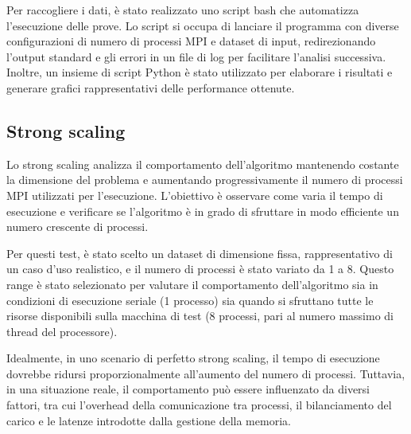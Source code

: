 \documentclass[letterpaper,11pt,leqno]{article}
\begin{document}
Per raccogliere i dati, è stato realizzato uno script bash che automatizza l'esecuzione delle prove. Lo script si occupa di lanciare il programma con diverse configurazioni di numero di processi MPI e dataset di input, redirezionando l'output standard e gli errori in un file di log per facilitare l'analisi successiva. Inoltre, un insieme di script Python è stato utilizzato per elaborare i risultati e generare grafici rappresentativi delle performance ottenute.  

\subsection{Strong scaling}

Lo strong scaling analizza il comportamento dell'algoritmo mantenendo costante la dimensione del problema e aumentando progressivamente il numero di processi MPI utilizzati per l'esecuzione. L'obiettivo è osservare come varia il tempo di esecuzione e verificare se l'algoritmo è in grado di sfruttare in modo efficiente un numero crescente di processi.  

Per questi test, è stato scelto un dataset di dimensione fissa, rappresentativo di un caso d'uso realistico, e il numero di processi è stato variato da 1 a 8. Questo range è stato selezionato per valutare il comportamento dell'algoritmo sia in condizioni di esecuzione seriale (1 processo) sia quando si sfruttano tutte le risorse disponibili sulla macchina di test (8 processi, pari al numero massimo di thread del processore).  

Idealmente, in uno scenario di perfetto strong scaling, il tempo di esecuzione dovrebbe ridursi proporzionalmente all'aumento del numero di processi. Tuttavia, in una situazione reale, il comportamento può essere influenzato da diversi fattori, tra cui l'overhead della comunicazione tra processi, il bilanciamento del carico e le latenze introdotte dalla gestione della memoria. 
\end{document}
